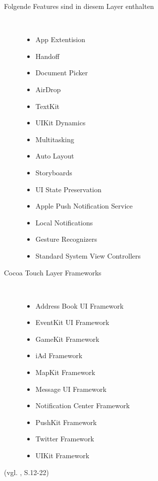 \begin{description}
\item[Folgende Features sind in diesem Layer enthalten]~\par
	\begin{multicols}{2}
	\begin{itemize}
		\item App Extentision
		\item Handoff
		\item Document Picker
		\item AirDrop
		\item TextKit
		\item UIKit Dynamics
		\item Multitasking
		\item Auto Layout
		\item Storyboards
		\item UI State Preservation
		\item Apple Push Notification Service
		\item Local Notifications
		\item Gesture Recognizers
		\item Standard System View Controllers
         \end{itemize}
	\end{multicols}
	
	\item[Cocoa Touch Layer Frameworks]~\par
	\begin{multicols}{2}
	\begin{itemize}
		\item Address Book UI Framework
		\item EventKit UI Framework
		\item GameKit Framework
		\item iAd Framework
		\item MapKit Framework
		\item Message UI Framework
		\item Notification Center Framework
		\item PushKit Framework
		\item Twitter Framework
		\item UIKit Framework
         \end{itemize}
	\end{multicols}
\end{description}
(vgl. \cite{Apple[6]}, S.12-22)

\pagebreak
